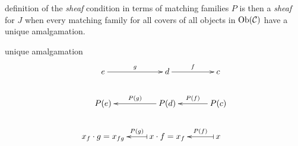 \begin{frame}
\begin{block}{definition of the {\it sheaf} condition in terms of matching families}
$P$ is then a {\it sheaf} for $J$ when every matching family for all covers of all objects in $\mathop{\rm Ob}\nolimits({\mathcal C})$ have a unique amalgamation. 
\end{block}
\begin{block}{unique amalgamation}
\begin{displaymath}
\xymatrix{
e \ar[r]^-{g} & d \ar[r]^-{f} & c\\
P(e) & P(d) \ar[l]_-{P(g)} & P(c) \ar[l]_-{P(f)}\\
x_f \cdot g = x_{fg} & x \cdot f = x_f \ar@{|->}[l]_-{P(g)} & x \ar@{|->}[l]_-{P(f)}
}
\end{displaymath}
\end{block}
\end{frame}
